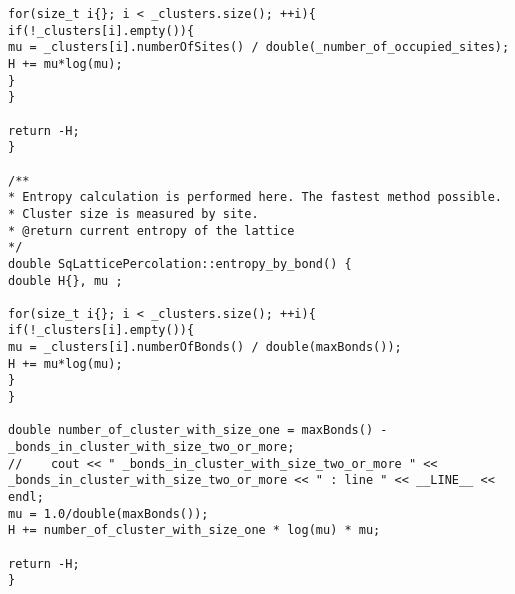 \begin{lstlisting}[style=CStyle]
for(size_t i{}; i < _clusters.size(); ++i){
if(!_clusters[i].empty()){
mu = _clusters[i].numberOfSites() / double(_number_of_occupied_sites);
H += mu*log(mu);
}
}

return -H;
}

/**
* Entropy calculation is performed here. The fastest method possible.
* Cluster size is measured by site.
* @return current entropy of the lattice
*/
double SqLatticePercolation::entropy_by_bond() {
double H{}, mu ;

for(size_t i{}; i < _clusters.size(); ++i){
if(!_clusters[i].empty()){
mu = _clusters[i].numberOfBonds() / double(maxBonds());
H += mu*log(mu);
}
}

double number_of_cluster_with_size_one = maxBonds() - _bonds_in_cluster_with_size_two_or_more;
//    cout << " _bonds_in_cluster_with_size_two_or_more " << _bonds_in_cluster_with_size_two_or_more << " : line " << __LINE__ << endl;
mu = 1.0/double(maxBonds());
H += number_of_cluster_with_size_one * log(mu) * mu;

return -H;
}
\end{lstlisting}